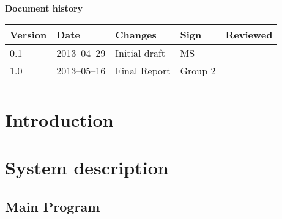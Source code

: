 \documentclass[10pt, a4paper, twoside]{article}
\numberwithin{equation}{subsection}
\numberwithin{figure}{section}
\numberwithin{table}{section}
\begin{document}



\newpage
\pagestyle{fancy}
\setcounter{page}{2} %




\newpage
\tableofcontents
\listoffigures



\newpage
\vspace*{5\baselineskip}

\begin{center}
\textbf{\LARGE Document history}

{ \footnotesize 
\begin{tabular}{|p{1cm}|p{2.0cm}|p{5cm}|p{1.5cm}|p{2cm}|}
	\hline
	\textbf{Version} & \textbf{Date} & \textbf{Changes} & \textbf{Sign} & \textbf{Reviewed} \\
	
	\hline
	0.1 & 2013--04--29 & Initial draft & MS & \\
	\hline
	1.0 & 2013--05--16 & Final Report & Group 2 & \\
	
	\hline
	 &  &  &  &  \\
	
	\hline
\end{tabular}
}
\end{center}





%
%
\newpage
{}

\newpage
\section{Introduction}


\section{System description}
\label{sec:system_description}


\newpage
\subsection{Main Program}
\label{sec:main_program}

\end{document}
